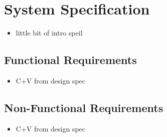 \section{System Specification}
\label{sec:spec}
{\color{red}
	\begin{itemize}
		\item little bit of intro speil 
	\end{itemize}
}

\subsection{Functional Requirements}
\label{sec:funcs}

{\color{red}
	\begin{itemize}
		\item C+V from design spec
	\end{itemize}
}

\subsection{Non-Functional Requirements}
{\color{red}
	\begin{itemize}
		\item C+V from design spec
	\end{itemize}
}